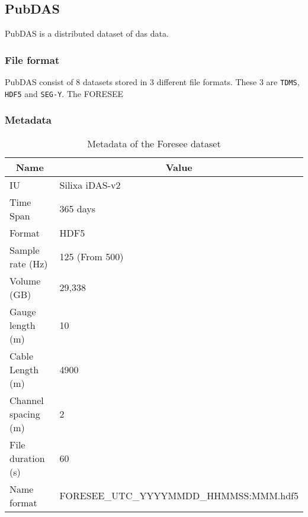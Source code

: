 \subsection{PubDAS}

PubDAS \cite{spica2023pubdas} is a distributed dataset of \acrfull{das} data. 



\subsubsection{File format}

PubDAS consist of 8 datasets stored in 3 different file formats. These 3 are \texttt{TDMS}, \texttt{HDF5} and \texttt{SEG-Y}. 
The FORESEE

\subsubsection{Metadata}

\begin{table}[h]
    \small
    \centering
    \begin{tabular}{|l|l|}
    \toprule
    \multicolumn{1}{|c|}{\textbf{Name}} & \multicolumn{1}{c|}{\textbf{Value}} \\ \hline
    IU                                  & Silixa iDAS-v2                      \\ \hline
    Time Span                           & 365 days                            \\ \hline
    Format                              & HDF5                                \\ \hline
    Sample rate (Hz)                    & 125 (From 500)                      \\ \hline
    Volume (GB)                         & 29,338                              \\ \hline
    Gauge length (m)                    & 10                                  \\ \hline
    Cable Length (m)                    & 4900                                \\ \hline
    Channel spacing (m)                 & 2                                   \\ \hline
    File duration (s)                   & 60                                  \\ \hline
    Name format                         & FORESEE\_UTC\_YYYYMMDD\_HHMMSS:MMM.hdf5 \\ 
    \bottomrule
    \end{tabular}
    \caption{Metadata of the Foresee dataset}
    \label{tab:foresee_meta}
\end{table}


